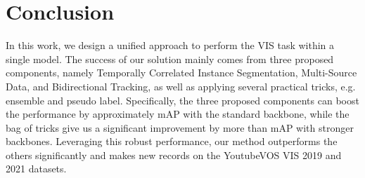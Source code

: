 \documentclass[10pt,twocolumn,letterpaper]{article}
\begin{document}
\section{Conclusion}
\label{sec:conclusion}
In this work, we design a unified approach to perform the VIS task within a single model. The success of our solution mainly comes from three proposed components, namely Temporally Correlated Instance Segmentation, Multi-Source Data, and Bidirectional Tracking, as well as applying several practical tricks, e.g. ensemble and pseudo label. Specifically, the three proposed components can boost the performance by approximately  mAP with the standard backbone, while the bag of tricks give us a significant improvement by more than  mAP with stronger backbones. Leveraging this robust performance, our method outperforms the others significantly and makes new records on the YoutubeVOS VIS 2019 and 2021 datasets.
 


{\small


}
\end{document}
